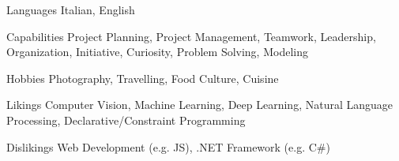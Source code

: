\begin{minipage}[]{0.4\textwidth}
  \vspace{2.0mm}

  \begin{cvskills}
    \hspace{4.0mm}
    \cvskill
      {Languages}
      {Italian, English}
    
    \cvskill
      {Capabilities}
      {Project Planning, Project Management, Teamwork, Leadership, Organization, Initiative, Curiosity, Problem Solving, Modeling}

    \cvskill
      {Hobbies}
      {Photography, Travelling, Food Culture, Cuisine}
  \end{cvskills}
\end{minipage}%
\begin{minipage}[]{0.6\textwidth}
  \hfill
\end{minipage}
\vspace{2.0mm}


\begin{minipage}[]{0.4\textwidth}
  \vspace{2.0mm}

  \begin{cvskills}
    \hspace{10.0mm}
    \cvskill
      {Likings}
      {Computer Vision, Machine Learning, Deep Learning, Natural Language Processing, Declarative/Constraint Programming}
    
    \cvskill
      {Dislikings}
      {Web Development (e.g. JS), .NET Framework (e.g. C\#)}
  \end{cvskills}
\end{minipage}%
\begin{minipage}[]{0.6\textwidth}
  \hfill
\end{minipage}
\vspace{4.0mm}
